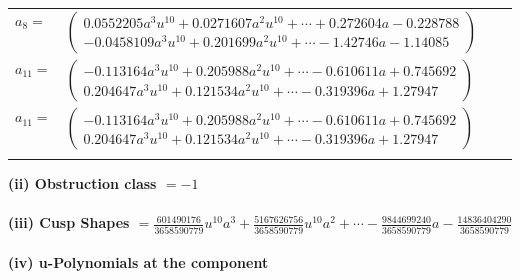 \documentclass[1p]{elsarticle_modified}
\theoremstyle{definition}
\begin{document}
\begin{tabular}{m{7pt} m{180pt} m{7pt} m{180pt} }
\flushright $a_{8}=$&$\begin{pmatrix}0.0552205 a^{3} u^{10}+0.0271607 a^{2} u^{10}+\cdots+0.272604 a-0.228788\\-0.0458109 a^{3} u^{10}+0.201699 a^{2} u^{10}+\cdots-1.42746 a-1.14085\end{pmatrix}$ \\
\flushright $a_{11}=$&$\begin{pmatrix}-0.113164 a^{3} u^{10}+0.205988 a^{2} u^{10}+\cdots-0.610611 a+0.745692\\0.204647 a^{3} u^{10}+0.121534 a^{2} u^{10}+\cdots-0.319396 a+1.27947\end{pmatrix}$\\ \flushright $a_{11}=$&$\begin{pmatrix}-0.113164 a^{3} u^{10}+0.205988 a^{2} u^{10}+\cdots-0.610611 a+0.745692\\0.204647 a^{3} u^{10}+0.121534 a^{2} u^{10}+\cdots-0.319396 a+1.27947\end{pmatrix}$\\&\end{tabular}
\flushleft \textbf{(ii) Obstruction class $= -1$}\\~\\
\flushleft \textbf{(iii) Cusp Shapes $= \frac{601490176}{3658590779} u^{10} a^3+\frac{5167626756}{3658590779} u^{10} a^2+\cdots-\frac{9844699240}{3658590779} a-\frac{14836404290}{3658590779}$}\\~\\
\newpage\renewcommand{\arraystretch}{1}
\flushleft \textbf{(iv) u-Polynomials at the component}\newline \\
\end{document}
